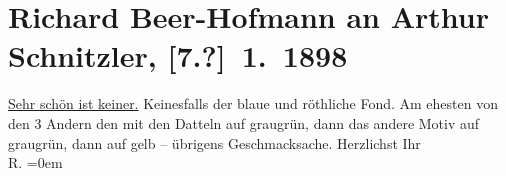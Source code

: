 

         
         \renewcommand{\erwaehntePersonen}{Personen: Richard Beer-Hofmann}
         \renewcommand{\erwaehnteOrte}{Orte: Wien}
         \renewcommand{\erwaehnteWerke}{}
               \section[Richard Beer-Hofmann an Arthur Schnitzler, {[}7.?{]} 1. 1898]{ Richard Beer-Hofmann an Arthur Schnitzler, {[}7.?{]} 1. 1898}\nopagebreak{}\rehead{ }\begin{ledgroupsized}[t]{13cm}\normalsize\beginnumbering{} \toendnotes[C]{\smallbreak\pagebreak[2]} 
\pstart
           \noindent{}{\pb}\uline{Sehr schön ist keiner.}\pend
           \pstart
           Keinesfalls der blaue und röthliche Fond.\pend
           \pstart
           Am ehesten  von den 3 Andern den mit den Datteln
               auf graugrün,  dann das andere Motiv auf
               graugrün, dann auf gelb – {\pb}übrigens
               Geschmacksache.\pend
           \pstart
            Herzlichst Ihr{\\[\baselineskip]}\spacefill\mbox{R.}\pend
           \leftskip=0em{}
         
         \endnumbering{}\end{ledgroupsized}  \newcommand{\dateiname}{L00760}\newcommand{\titel}{Richard Beer-Hofmann an Arthur Schnitzler, [7.?] 1. 1898}\newcommand{\editorInnen}{Martin Anton Müller und Gerd-Hermann Susen}
      